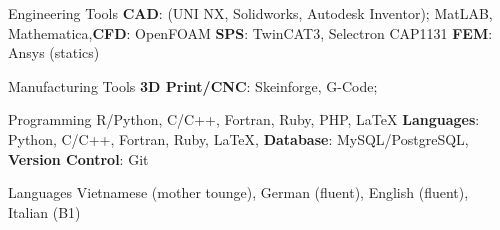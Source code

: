 

\begin{cvskills}

  \cvskill
    {Engineering Tools} %
    {\textbf{CAD}: (UNI NX, Solidworks, Autodesk Inventor); MatLAB, Mathematica,\newline \textbf{CFD}: OpenFOAM
    \newline \textbf{SPS}: TwinCAT3, Selectron CAP1131
	\newline \textbf{FEM}: Ansys (statics)} %

  \cvskill
    {Manufacturing Tools} %
    {\textbf{3D Print/CNC}: Skeinforge, G-Code;} %

  \cvskill
    {Programming} %
    {R/Python, C/C++, Fortran, Ruby, PHP, LaTeX} %
    {\textbf{Languages}: Python, C/C++, Fortran, Ruby, LaTeX, 
    	\newline \textbf{Database}: MySQL/PostgreSQL,
    	\newline \textbf{Version Control}: Git} %


  \cvskill
    {Languages} %
    {Vietnamese (mother tounge), German (fluent), English (fluent), Italian (B1)} %

\end{cvskills}
